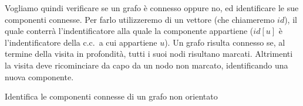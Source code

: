 
Vogliamo quindi verificare se un grafo è connesso oppure no, ed identificare le sue componenti connesse.
Per farlo utilizzeremo di un vettore (che chiameremo \(id\)), il quale conterrà l'indentificatore alla quale la componente appartiene (\(id[u]\) è l'indentificatore della c.c.\ a cui appartiene \(u\)).
Un grafo risulta connesso se, al termine della visita in profondità, tutti i suoi nodi risultano marcati.
Altrimenti la visita deve ricominciare da capo da un nodo non marcato, identificando una nuova componente.

\begin{algorithm}[h]
	\caption[Componenti Connesse]{Identifica le componenti connesse di un grafo non orientato}
	
	
\end{algorithm}

